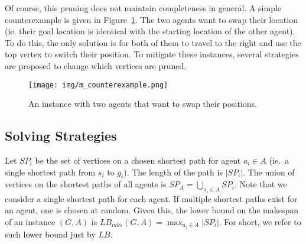 %

Of course, this pruning does not maintain completeness in general. A simple counterexample is given in Figure~\ref{fig:m_counterexample}. The two agents want to swap their location (ie. their goal location is identical with the starting location of the other agent). To do this, the only solution is for both of them to travel to the right and use the top vertex to switch their position. %
To mitigate these instances, several strategies are proposed to change which vertices are pruned.
%
\begin{figure}[ht]
\centering
\texttt{[image: img/m\_counterexample.png]}
\caption{An instance with two agents that want to swap their positions.}
\label{fig:m_counterexample}
\end{figure}
%

\subsection*{Solving Strategies}
%
%
Let $SP_i$ be the set of vertices on a chosen shortest path for agent $a_i \in A$ (ie.\ a single shortest path from $s_i$ to $g_i$). The length of the path is $|SP_i|$. The union of vertices on the shortest paths of all agents is $SP_A = \bigcup_{a_i \in A} SP_i$. Note that we consider a single shortest path for each agent. If multiple shortest paths exist for an agent, one is chosen at random. Given this, the lower bound on the makespan of an instance $(G,A)$ is $LB_{mks}(G,A) = \max_{a_i \in A} |SP_i|$. For short, we refer to such lower bound just by $LB$.
%

